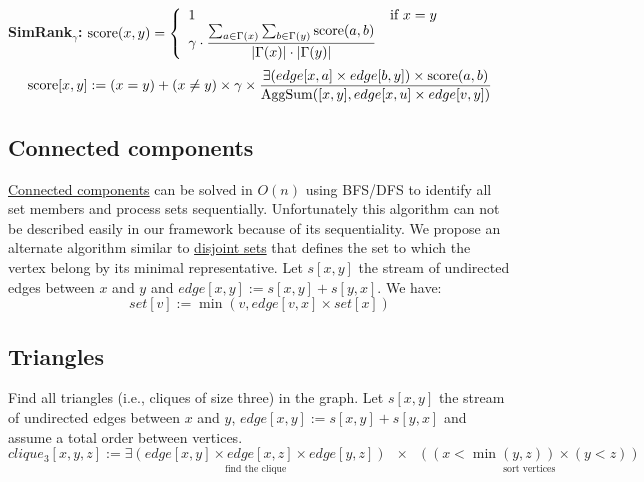 \documentclass[11pt]{article}
\begin{document}
{\bf SimRank${}_\gamma$:} ${\rm score}(x,y)=\left\{\begin{array}{ll}1&\text{if }x=y\\
	\gamma\cdot\dfrac{\sum_{a\in\Gamma(x)}\sum_{b\in\Gamma(y)} {\rm score}(a,b)}
		{|\Gamma(x)| \cdot |\Gamma(y)|} \end{array}\right.$
\[{\rm score}[x,y] := (x=y) + (x\ne y) \times\gamma\times\dfrac
	{\exists(edge[x,a] \times edge[b,y]) \times {\rm score}(a,b)}
	{{\rm AggSum}([x,y], edge[x,u] \times edge[v,y])}\]

\subsection{Connected components}
\href{http://en.wikipedia.org/wiki/Connected_component_(graph_theory)}{Connected components} can be solved in $O(n)$ using BFS/DFS to identify all set members and process sets sequentially. Unfortunately this algorithm can not be described easily in our framework because of its sequentiality. We propose an alternate algorithm similar to \href{http://en.wikipedia.org/wiki/Disjoint-set_data_structure}{disjoint sets} that defines the set to which the vertex belong by its minimal representative. Let $s[x,y]$ the stream of undirected edges between $x$ and $y$ and $edge[x,y] := s[x,y]+s[y,x]$. We have:
\[set[v] := \min(v, edge[v,x] \times set[x])\]

\subsection{Triangles}
Find all triangles (i.e., cliques of size three) in the graph. Let $s[x,y]$ the stream of undirected edges between $x$ and $y$, $edge[x,y] := s[x,y]+s[y,x]$ and assume a total order between vertices.
\[clique_3[x,y,z] := \underset{\text{find the clique}}{\exists(edge[x,y] \times edge[x,z] \times edge[y,z])}
	\;\;\times\;\; \underset{\text{sort vertices}}{((x< \min(y,z)) \times (y < z))}\]

\end{document}

